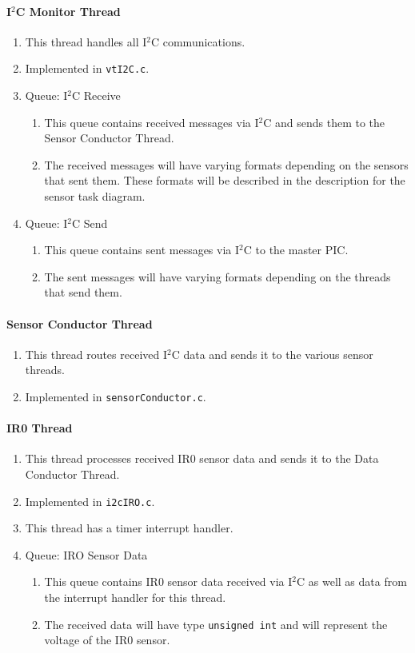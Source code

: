 \paragraph*{I$^2$C Monitor Thread}
\begin{enumerate}
	\item This thread handles all I$^2$C communications.
	\item Implemented in \texttt{vtI2C.c}.
	\item Queue: I$^2$C Receive
	\begin{enumerate}
		\item This queue contains received messages via I$^2$C and sends them to the Sensor Conductor Thread.
		\item The received messages will have varying formats depending on the sensors that sent them. These formats will be described in the description for the sensor task diagram.
	\end{enumerate}
	\item Queue: I$^2$C Send
	\begin{enumerate}
		\item This queue contains sent messages via I$^2$C to the master PIC.
		\item The sent messages will have varying formats depending on the threads that send them.
	\end{enumerate}
\end{enumerate}

\paragraph*{Sensor Conductor Thread}
\begin{enumerate}
	\item This thread routes received I$^2$C data and sends it to the various sensor threads.
	\item Implemented in \texttt{sensorConductor.c}.
\end{enumerate}

\paragraph*{IR0 Thread}
\begin{enumerate}
	\item This thread processes received IR0 sensor data and sends it to the Data Conductor Thread.
	\item Implemented in \texttt{i2cIRO.c}.
	\item This thread has a timer interrupt handler.
	\item Queue: IRO Sensor Data
	\begin{enumerate}
		\item This queue contains IR0 sensor data received via I$^2$C as well as data from the interrupt handler for this thread.
		\item The received data will have type \texttt{unsigned int} and will represent the voltage of the IR0 sensor.
	\end{enumerate}
\end{enumerate}

